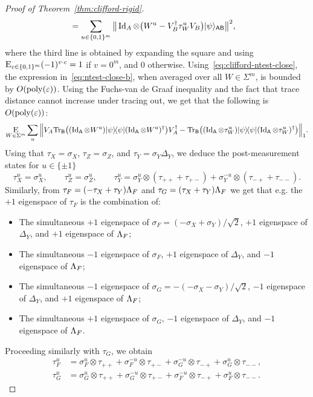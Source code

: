 \begin{proof}[Proof of Theorem~\ref{thm:clifford-rigid}]
\begin{align}
&= \sum_{u\in\{0,1\}^m}\big\|  \mathop{\rm Id}\nolimits_A \otimes \big(  W^{u} - V_B^\dagger\tau_{W}^{u} V_B\big)   |\psi\rangle_{{\textsf{AB}}} \big\|^2, \label{eq:ntest-close-b}  
\end{align}
where the third line is obtained by expanding the square and using
  $\mathop{\textsc{E}}_{c\in\{0,1\}^m} (-1)^{v \cdot c} = 1$ if $v=0^m$, and $0$ otherwise. Using~\eqref{eq:clifford-ntest-close}, the expression in~\eqref{eq:ntest-close-b}, when averaged over all $W\in\Sigma^{ m}$, is bounded by $O(\operatorname{poly}(\varepsilon))$. Using the Fuchs-van de Graaf inequality and the fact that trace distance cannot increase under tracing out, we get that the following is $O(\mathrm{poly}(\varepsilon))$:
\begin{equation}\label{eq:ntest-close-c}
\Es{W\in\Sigma^{m}}\sum_{u} \Big\| V_A\Tr_\reg{B}\big( (\Id_\reg{A} \otimes W^{u})\proj{\psi}(\Id_\reg{A} \otimes W^{u})^\dagger \big) V_A^\dagger- \Tr_\reg{B}\big( (\Id_\reg{A} \otimes \tau_W^{u})\proj{\psi}(\Id_\reg{A} \otimes \tau_W^{u})^\dagger \big) \Big\|_1. %
\end{equation}
Using that $\tau_X = \sigma_X$, $\tau_Z = \sigma_Z$, and $\tau_Y = \sigma_Y \Delta_Y$, we deduce the post-measurement states for $u\in\{\pm 1\}$
$$ \tau_X^u = \sigma_X^u, \qquad \tau_Z^u = \sigma_Z^u,\qquad \tau_Y^u = \sigma_{Y}^u \otimes (\tau_{++}+\tau_{+-}) + \sigma_{Y}^{-u} \otimes (\tau_{-+}+\tau_{--}).$$ 
Similarly, from $\tau_F = (-\tau_X + \tau_Y)\Lambda_F$ and $\tau_G = (\tau_X + \tau_Y)\Lambda_F$ we get that e.g. the $+1$ eigenspace of $\tau_F$ is the combination of:
\begin{itemize}[nolistsep]
\item The simultaneous $+1$ eigenspace of $\sigma_F = (-\sigma_X+\sigma_Y)/\sqrt{2}$, $+1$ eigenspace of $\Delta_Y$, and $+1$ eigenspace of $\Lambda_F$;
\item The simultaneous $-1$ eigenspace of $\sigma_F$, $+1$ eigenspace of $\Delta_Y$, and $-1$ eigenspace of $\Lambda_F$;
\item The simultaneous $-1$ eigenspace of $\sigma_G = -(-\sigma_X-\sigma_Y)/\sqrt{2}$, $-1$ eigenspace of $\Delta_Y$, and $+1$ eigenspace of $\Lambda_F$;
\item The simultaneous $+1$ eigenspace of $\sigma_G$, $-1$ eigenspace of $\Delta_Y$, and $-1$ eigenspace of $\Lambda_F$.
\end{itemize}

Proceeding similarly with $\tau_G$, we obtain 
\begin{align*}
 \tau_F^u &= \sigma_F^u \otimes \tau_{++} + \sigma_F^{-u} \otimes \tau_{+-} + \sigma_G^{-u} \otimes \tau_{-+} + \sigma_G^u \otimes \tau_{--},\\
 \tau_G^u &= \sigma_G^u \otimes \tau_{++} + \sigma_G^{-u} \otimes \tau_{+-} + \sigma_F^{-u} \otimes \tau_{-+} + \sigma_F^u \otimes \tau_{--}.
\end{align*}


\end{proof}
